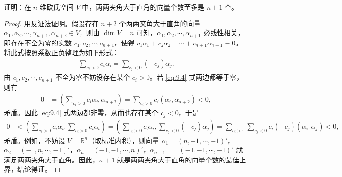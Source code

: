 \documentclass[../../main.tex]{subfiles}%
\begin{document}
\begin{proposition}\label{proposition:例9.6}
证明：在 $n$ 维欧氏空间 $V$ 中，两两夹角大于直角的向量个数至多是 $n + 1$ 个。
\end{proposition}
\begin{proof}
用反证法证明。假设存在 $n + 2$ 个两两夹角大于直角的向量 $\alpha_1,\alpha_2,\cdots,\alpha_{n + 1},\alpha_{n + 2}\in V$，则由 $\dim V = n$ 可知，$\alpha_1,\alpha_2,\cdots,\alpha_{n + 1}$ 必线性相关，即存在不全为零的实数 $c_1,c_2,\cdots,c_{n + 1}$，使得 $c_1\alpha_1 + c_2\alpha_2 + \cdots + c_{n + 1}\alpha_{n + 1} = 0$。将此式按照系数正负整理为如下形式：
\begin{align}
\sum_{c_i > 0}c_i\alpha_i = \sum_{c_j < 0}(-c_j)\alpha_j.\label{eq:9.4}
\end{align}
由 $c_1,c_2,\cdots,c_{n + 1}$ 不全为零不妨设存在某个 $c_i > 0$。若 \eqref{eq:9.4} 式两边都等于零，则有
\begin{align*}
0&=(\sum_{c_i > 0}c_i\alpha_i,\alpha_{n + 2})=\sum_{c_i > 0}c_i(\alpha_i,\alpha_{n + 2})<0,
\end{align*}
矛盾。因此 \eqref{eq:9.4} 式两边都非零，从而也存在某个 $c_j < 0$，于是
\begin{align*}
0&<(\sum_{c_i > 0}c_i\alpha_i,\sum_{c_i > 0}c_i\alpha_i)=(\sum_{c_i > 0}c_i\alpha_i,\sum_{c_j < 0}(-c_j)\alpha_j)=\sum_{c_i > 0}\sum_{c_j < 0}c_i(-c_j)(\alpha_i,\alpha_j)<0,
\end{align*}
矛盾。例如，不妨设 $V = \mathbb{R}^n$（取标准内积），则向量 $\alpha_1 = (n,-1,\cdots,-1)'$，$\alpha_2 = (-1,n,\cdots,-1)'$，$\alpha_n = (-1,-1,\cdots,n)'$，$\alpha_{n + 1}$ $=$ $(-1,-1,\cdots,-1)'$ 就满足两两夹角大于直角。因此，$n + 1$ 就是两两夹角大于直角的向量个数的最佳上界，结论得证。 
\end{proof}
\end{document}

